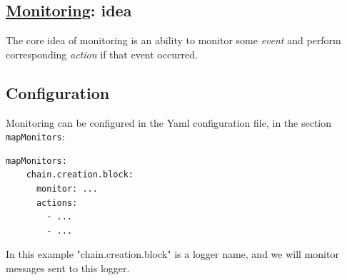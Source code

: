 

\pagecolor{atomictangerine!50}




\begin{mdframed}
\section*{\href{https://github.com/input-output-hk/iohk-monitoring-framework/blob/master/iohk-monitoring/src/Cardano/BM/Backend/Monitoring.lhs}{Monitoring}: idea}

    The core idea of monitoring is an ability to monitor some \textit{event} and perform corresponding \textit{action} if that event occurred.
\end{mdframed}

\begin{mdframed}
\section*{Configuration}

Monitoring can be configured in the Yaml configuration file, in the section \texttt{mapMonitors}:

\begin{lstlisting}[language=bash]
  mapMonitors:
    chain.creation.block:
      monitor: ...
      actions:
        - ...
        - ...
\end{lstlisting}

In this example "chain.creation.block" is a logger name, and we will monitor messages sent to this logger.

\end{mdframed}

